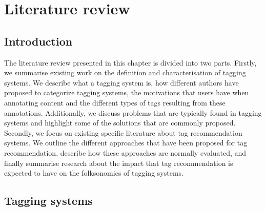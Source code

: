 
\chapter{Literature review}
\label{sec:SOA}

\section{Introduction}

The literature review presented in this chapter is divided into two parts.
Firstly, we summarise existing work on the definition and characterisation of tagging systems.
We describe what a tagging system is, how different authors have proposed to categorize tagging systems, the motivations that users have when annotating content and the different types of tags resulting from these annotations. Additionally, we discuss problems that are typically found in tagging systems and highlight some of the solutions that are commonly proposed. 
Secondly, we focus on existing specific literature about tag recommendation systems.
We outline the different approaches that have been proposed for tag recommendation, describe how these approaches are normally evaluated, and finally summarise research about the impact that tag recommendation is expected to have on the folksonomies of tagging systems.


\section{Tagging systems}
\label{sec:SOA:tagging_systems}

